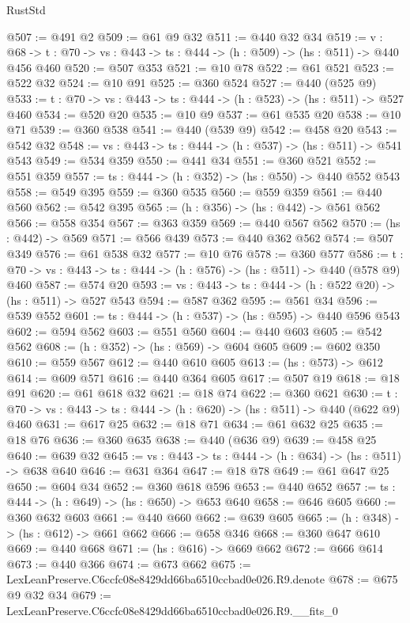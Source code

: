 \begin{lexlean}{RustStd}
\begin{coremodule}
@507 := @491 @2
@509 := @61 @9 @32
@511 := @440 @32 @34
@519 := {v : @68} ->
  {t : @70} -> {vs : @443} -> {ts : @444} -> (h : @509) -> (hs : @511) -> @440 @456 @460
@520 := @507 @353
@521 := @10 @78
@522 := @61 @521
@523 := @522 @32
@524 := @10 @91
@525 := @360 @524
@527 := @440 (@525 @9)
@533 := {t : @70} -> {vs : @443} -> {ts : @444} -> (h : @523) -> (hs : @511) -> @527 @460
@534 := @520 @20
@535 := @10 @9
@537 := @61 @535 @20
@538 := @10 @71
@539 := @360 @538
@541 := @440 (@539 @9)
@542 := @458 @20
@543 := @542 @32
@548 := {vs : @443} -> {ts : @444} -> (h : @537) -> (hs : @511) -> @541 @543
@549 := @534 @359
@550 := @441 @34
@551 := @360 @521
@552 := @551 @359
@557 := {ts : @444} -> (h : @352) -> (hs : @550) -> @440 @552 @543
@558 := @549 @395
@559 := @360 @535
@560 := @559 @359
@561 := @440 @560
@562 := @542 @395
@565 := (h : @356) -> (hs : @442) -> @561 @562
@566 := @558 @354
@567 := @363 @359
@569 := @440 @567 @562
@570 := (hs : @442) -> @569
@571 := @566 @439
@573 := @440 @362 @562
@574 := @507 @349
@576 := @61 @538 @32
@577 := @10 @76
@578 := @360 @577
@586 := {t : @70} -> {vs : @443} -> {ts : @444} -> (h : @576) -> (hs : @511) -> @440 (@578 @9) @460
@587 := @574 @20
@593 := {vs : @443} -> {ts : @444} -> (h : @522 @20) -> (hs : @511) -> @527 @543
@594 := @587 @362
@595 := @561 @34
@596 := @539 @552
@601 := {ts : @444} -> (h : @537) -> (hs : @595) -> @440 @596 @543
@602 := @594 @562
@603 := @551 @560
@604 := @440 @603
@605 := @542 @562
@608 := (h : @352) -> (hs : @569) -> @604 @605
@609 := @602 @350
@610 := @559 @567
@612 := @440 @610 @605
@613 := (hs : @573) -> @612
@614 := @609 @571
@616 := @440 @364 @605
@617 := @507 @19
@618 := @18 @91
@620 := @61 @618 @32
@621 := @18 @74
@622 := @360 @621
@630 := {t : @70} -> {vs : @443} -> {ts : @444} -> (h : @620) -> (hs : @511) -> @440 (@622 @9) @460
@631 := @617 @25
@632 := @18 @71
@634 := @61 @632 @25
@635 := @18 @76
@636 := @360 @635
@638 := @440 (@636 @9)
@639 := @458 @25
@640 := @639 @32
@645 := {vs : @443} -> {ts : @444} -> (h : @634) -> (hs : @511) -> @638 @640
@646 := @631 @364
@647 := @18 @78
@649 := @61 @647 @25
@650 := @604 @34
@652 := @360 @618 @596
@653 := @440 @652
@657 := {ts : @444} -> (h : @649) -> (hs : @650) -> @653 @640
@658 := @646 @605
@660 := @360 @632 @603
@661 := @440 @660
@662 := @639 @605
@665 := (h : @348) -> (hs : @612) -> @661 @662
@666 := @658 @346
@668 := @360 @647 @610
@669 := @440 @668
@671 := (hs : @616) -> @669 @662
@672 := @666 @614
@673 := @440 @366
@674 := @673 @662
@675 := LexLeanPreserve.C6ccfc08e8429dd66ba6510ccbad0e026.R9.denote
@678 := @675 @9 @32 @34
@679 := LexLeanPreserve.C6ccfc08e8429dd66ba6510ccbad0e026.R9.__fits_0

\end{coremodule}
\end{lexlean}
